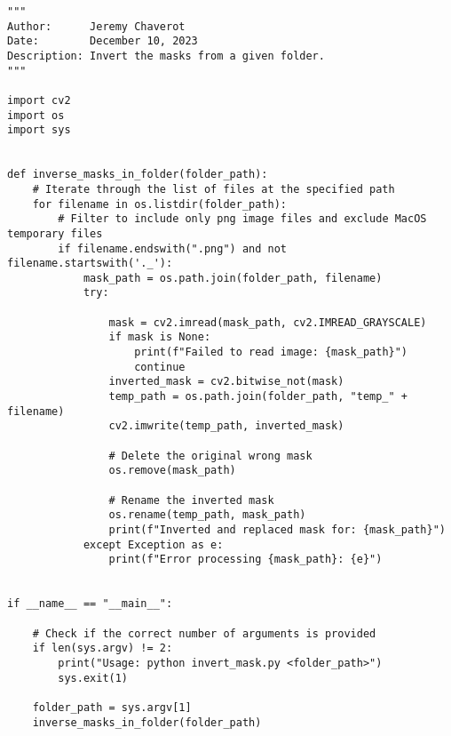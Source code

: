 \begin{lstlisting}[style=pythonstyle, label=lst:5, caption=Python script \texttt{invert\_mask.py} to invert the masks from a specified folder. We aim to have a black object set against a white background.]
"""
Author:      Jeremy Chaverot
Date:        December 10, 2023
Description: Invert the masks from a given folder.
"""

import cv2
import os
import sys


def inverse_masks_in_folder(folder_path):
	# Iterate through the list of files at the specified path
    for filename in os.listdir(folder_path):
    	# Filter to include only png image files and exclude MacOS temporary files
        if filename.endswith(".png") and not filename.startswith('._'):
            mask_path = os.path.join(folder_path, filename)
            try:
                
                mask = cv2.imread(mask_path, cv2.IMREAD_GRAYSCALE)
                if mask is None:
                    print(f"Failed to read image: {mask_path}")
                    continue               
                inverted_mask = cv2.bitwise_not(mask)    
                temp_path = os.path.join(folder_path, "temp_" + filename)
                cv2.imwrite(temp_path, inverted_mask)

                # Delete the original wrong mask
                os.remove(mask_path)

                # Rename the inverted mask
                os.rename(temp_path, mask_path)
                print(f"Inverted and replaced mask for: {mask_path}")
            except Exception as e:
                print(f"Error processing {mask_path}: {e}")


if __name__ == "__main__":

	# Check if the correct number of arguments is provided
    if len(sys.argv) != 2:
        print("Usage: python invert_mask.py <folder_path>")
        sys.exit(1)

    folder_path = sys.argv[1]
    inverse_masks_in_folder(folder_path)
\end{lstlisting}

\cleardoublepage{}

